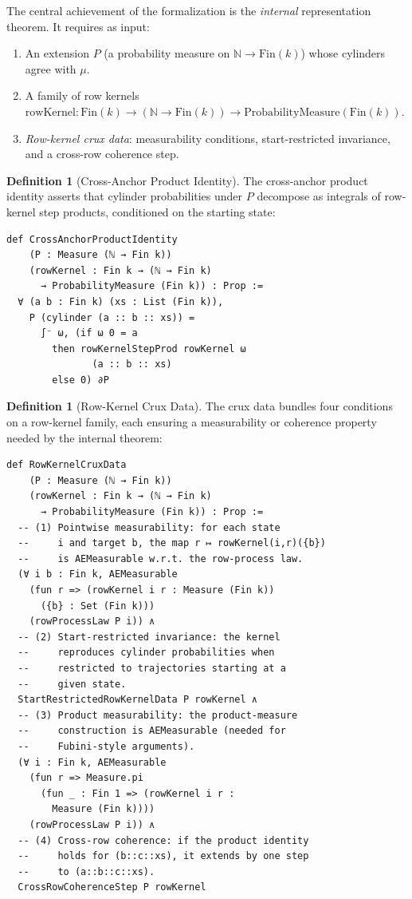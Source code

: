 \documentclass[11pt]{article}
\theoremstyle{definition}
\newtheorem{definition}[theorem]{Definition}
\newcommand{\Fin}{\mathrm{Fin}}
\newcommand{\NN}{\mathbb{N}}
\begin{document}
The central achievement of the formalization is the \emph{internal}
representation theorem.  It requires as input:

\begin{enumerate}[leftmargin=2em]
\item An extension $P$ (a probability measure on $\NN \to \Fin(k)$)
  whose cylinders agree with $\mu$.
\item A family of row kernels
  $\mathrm{rowKernel} : \Fin(k) \to (\NN \to \Fin(k)) \to
  \mathrm{ProbabilityMeasure}(\Fin(k))$.
\item \emph{Row-kernel crux data}: measurability conditions, start-restricted
  invariance, and a cross-row coherence step.
\end{enumerate}

\begin{definition}[Cross-Anchor Product Identity]
The cross-anchor product identity asserts that cylinder probabilities under
$P$ decompose as integrals of row-kernel step products, conditioned on
the starting state:
\begin{lstlisting}
def CrossAnchorProductIdentity
    (P : Measure (ℕ → Fin k))
    (rowKernel : Fin k → (ℕ → Fin k)
      → ProbabilityMeasure (Fin k)) : Prop :=
  ∀ (a b : Fin k) (xs : List (Fin k)),
    P (cylinder (a :: b :: xs)) =
      ∫⁻ ω, (if ω 0 = a
        then rowKernelStepProd rowKernel ω
               (a :: b :: xs)
        else 0) ∂P
\end{lstlisting}
\end{definition}

\begin{definition}[Row-Kernel Crux Data]
\label{def:cruxdata}
The crux data bundles four conditions on a row-kernel family, each
ensuring a measurability or coherence property needed by the internal
theorem:
\begin{lstlisting}
def RowKernelCruxData
    (P : Measure (ℕ → Fin k))
    (rowKernel : Fin k → (ℕ → Fin k)
      → ProbabilityMeasure (Fin k)) : Prop :=
  -- (1) Pointwise measurability: for each state
  --     i and target b, the map r ↦ rowKernel(i,r)({b})
  --     is AEMeasurable w.r.t. the row-process law.
  (∀ i b : Fin k, AEMeasurable
    (fun r => (rowKernel i r : Measure (Fin k))
      ({b} : Set (Fin k)))
    (rowProcessLaw P i)) ∧
  -- (2) Start-restricted invariance: the kernel
  --     reproduces cylinder probabilities when
  --     restricted to trajectories starting at a
  --     given state.
  StartRestrictedRowKernelData P rowKernel ∧
  -- (3) Product measurability: the product-measure
  --     construction is AEMeasurable (needed for
  --     Fubini-style arguments).
  (∀ i : Fin k, AEMeasurable
    (fun r => Measure.pi
      (fun _ : Fin 1 => (rowKernel i r :
        Measure (Fin k))))
    (rowProcessLaw P i)) ∧
  -- (4) Cross-row coherence: if the product identity
  --     holds for (b::c::xs), it extends by one step
  --     to (a::b::c::xs).
  CrossRowCoherenceStep P rowKernel
\end{lstlisting}
\end{definition}
\end{document}
